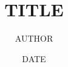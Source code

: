\documentclass{beamer}
\title{TITLE}
\author{AUTHOR}
\date{DATE}
\begin{document}
\begin{frame}
\titlepage%
\end{frame}
\end{document}
